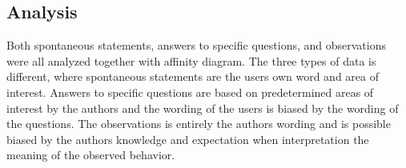 \subsection{Analysis}
Both spontaneous statements, answers to specific questions, and observations were all analyzed together with affinity diagram. The three types of data is different, where spontaneous statements are the users own word and area of interest. Answers to specific questions are based on predetermined areas of interest by the authors and the wording of the users is biased by the wording of the questions. The observations is entirely the authors wording and is possible biased by the authors knowledge and expectation when interpretation the meaning of the observed behavior. 